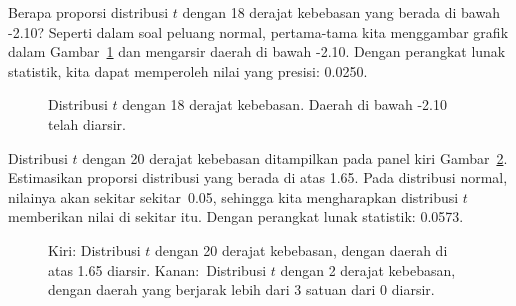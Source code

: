 \begin{examplewrap}
\begin{nexample}{Berapa proporsi distribusi $t$
    dengan 18 derajat kebebasan yang berada di bawah -2.10?}
  Seperti dalam soal peluang normal, pertama-tama kita menggambar
  grafik dalam Gambar~\ref{tDistDF18LeftTail2Point10}
  dan mengarsir daerah di bawah -2.10.
  Dengan perangkat lunak statistik, kita dapat memperoleh
  nilai yang presisi: 0.0250.
\end{nexample}
\end{examplewrap}

\begin{figure}
  \centering
  \caption{Distribusi $t$ dengan 18 derajat kebebasan.
      Daerah di bawah -2.10 telah diarsir.}
  \label{tDistDF18LeftTail2Point10}
\end{figure}

\begin{examplewrap}
\begin{nexample}{Distribusi $t$ dengan 20 derajat kebebasan
    ditampilkan pada panel kiri
    Gambar~\ref{tDistDF20RightTail1Point65}.
    Estimasikan proporsi distribusi yang berada
    di atas 1.65.}
  Pada distribusi normal, nilainya akan sekitar
  sekitar~0.05, sehingga kita mengharapkan distribusi $t$
  memberikan nilai di sekitar itu.
  Dengan perangkat lunak statistik: 0.0573.
\end{nexample}
\end{examplewrap}

\begin{figure}
  \centering
  \caption{Kiri: Distribusi $t$ dengan 20 derajat
      kebebasan, dengan daerah di atas 1.65 diarsir.
      Kanan:~Distribusi $t$ dengan 2 derajat kebebasan,
      dengan daerah yang berjarak lebih dari 3 satuan dari 0 diarsir.}
  \label{tDistDF20RightTail1Point65}
\end{figure}

